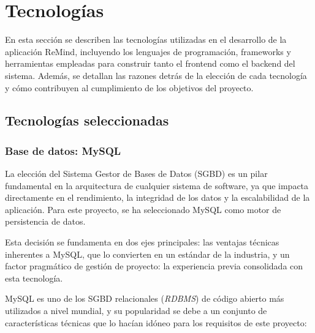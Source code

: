 \chapter{Tecnologías}

En esta sección se describen las tecnologías utilizadas en el desarrollo de la aplicación ReMind, incluyendo los lenguajes de programación, frameworks y herramientas empleadas para construir tanto el frontend como el backend del sistema. Además, se detallan las razones detrás de la elección de cada tecnología y cómo contribuyen al cumplimiento de los objetivos del proyecto.

\section{Tecnologías seleccionadas}

\subsection{Base de datos: MySQL}
La elección del Sistema Gestor de Bases de Datos (SGBD) es un pilar fundamental en la arquitectura de cualquier sistema de software, ya que impacta directamente en el rendimiento, la integridad de los datos y la escalabilidad de la aplicación. Para este proyecto, se ha seleccionado MySQL como motor de persistencia de datos.

Esta decisión se fundamenta en dos ejes principales: las ventajas técnicas inherentes a MySQL, que lo convierten en un estándar de la industria, y un factor pragmático de gestión de proyecto: la experiencia previa consolidada con esta tecnología.

MySQL es uno de los SGBD relacionales (\textit{RDBMS}) de código abierto más utilizados a nivel mundial, y su popularidad se debe a un conjunto de características técnicas que lo hacían idóneo para los requisitos de este proyecto: \cite{MySQLDocs}

